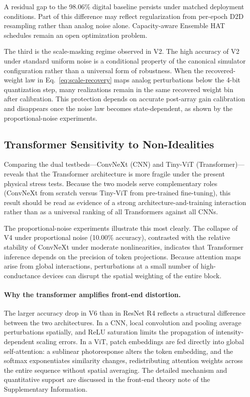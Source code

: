 A residual gap to the 98.06\% digital baseline persists under matched deployment conditions. Part of this difference may reflect regularization from per-epoch D2D resampling rather than analog noise alone. Capacity-aware Ensemble HAT schedules remain an open optimization problem.

The third is the scale-masking regime observed in V2. The high accuracy of V2 under standard uniform noise is a conditional property of the canonical simulator configuration rather than a universal form of robustness. When the recovered-weight law in Eq.~\ref{eq:scale-recovery} maps analog perturbations below the 4-bit quantization step, many realizations remain in the same recovered weight bin after calibration. This protection depends on accurate post-array gain calibration and disappears once the noise law becomes state-dependent, as shown by the proportional-noise experiments.

\subsection{Transformer Sensitivity to Non-Idealities}

Comparing the dual testbeds—ConvNeXt (CNN) and Tiny-ViT (Transformer)—reveals that the Transformer architecture is more fragile under the present physical stress tests. Because the two models serve complementary roles (ConvNeXt from scratch versus Tiny-ViT from pre-trained fine-tuning), this result should be read as evidence of a strong architecture-and-training interaction rather than as a universal ranking of all Transformers against all CNNs.

The proportional-noise experiments illustrate this most clearly. The collapse of V4 under proportional noise (10.00\% accuracy), contrasted with the relative stability of ConvNeXt under moderate nonlinearities, indicates that Transformer inference depends on the precision of token projections. Because attention maps arise from global interactions, perturbations at a small number of high-conductance devices can disrupt the spatial weighting of the entire block.

\paragraph{Why the transformer amplifies front-end distortion.}
The larger accuracy drop in V6 than in ResNet R4 reflects a structural difference between the two architectures. In a CNN, local convolution and pooling average perturbations spatially, and ReLU saturation limits the propagation of intensity-dependent scaling errors. In a ViT, patch embeddings are fed directly into global self-attention: a sublinear photoresponse alters the token embedding, and the softmax exponentiates similarity changes, redistributing attention weights across the entire sequence without spatial averaging. The detailed mechanism and quantitative support are discussed in the front-end theory note of the Supplementary Information.

